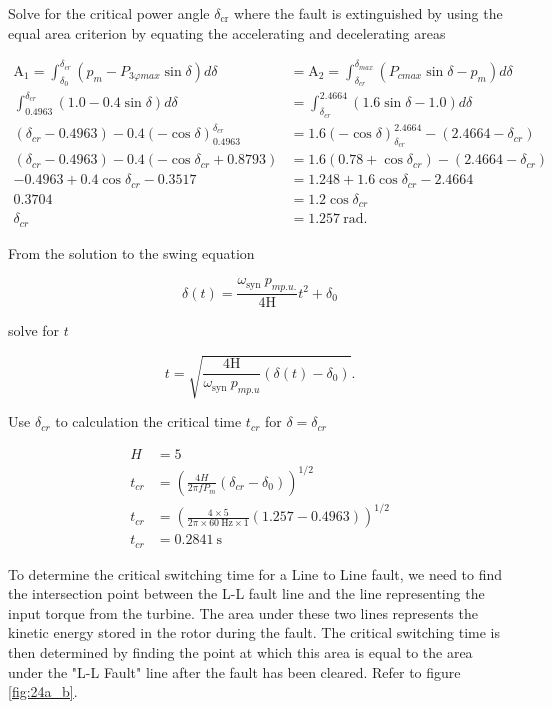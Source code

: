 \documentclass[main.tex]{subfiles}
\begin{document}
\begin{enumerate}
Solve for the critical power angle $\delta_{\mathrm{cr}}$ where the fault is extinguished by using the equal area criterion by equating the accelerating and decelerating areas 

$$
\begin{aligned}
\mathrm{A}_1=\int_{\delta_0}^{\delta_{cr}} (p_m - P_{3 \varphi max} \sin \delta) d\delta 
&= \mathrm{A}_2 = \int_{\delta_{cr}}^{\delta_{max}} (P_{cmax} \sin \delta - p_m) d \delta \\
\int_{0.4963}^{\delta_{cr}} (1.0-0.4 \sin \delta) d\delta &= \int_{\delta_{cr}}^{2.4664}(1.6 \sin \delta-1.0) d \delta \\
(\delta_{cr} - 0.4963) - 0.4(-\cos \delta)_{0.4963}^{\delta_{cr}} &= 1.6(-\cos \delta)_{\delta_{c r}}^{2.4664}-\left(2.4664-\delta_{c r}\right) \\
\left(\delta_{cr} - 0.4963\right) - 0.4\left(-\cos \delta_{cr} + 0.8793 \right) &= 1.6\left(0.78 + \cos \delta_{cr}\right) - \left(2.4664-\delta_{cr}\right) \\
-0.4963 + 0.4 \cos \delta_{cr} - 0.3517 &= 1.248 + 1.6 \cos \delta_{cr} - 2.4664 \\
0.3704 &= 1.2 \cos \delta_{c r} \\
\delta_{c r} &= 1.257 \mathrm{~rad}.
\end{aligned}
$$


From the solution to the swing equation 

$$
\delta(t)=\frac{\omega_{\text {syn }} p_{m p . u .}}{4 \mathrm{H}} t^2+\delta_0
$$

solve for $t$

$$
t=\sqrt{\frac{4 \mathrm{H}}{\omega_{\text {syn }} p_{m p . u}}\left(\delta(t)-\delta_0\right)}.
$$

Use $\delta_{cr}$ to calculation the critical time $t_{cr}$ for $\delta=\delta_{c r}$

$$
\begin{aligned}
H &= 5\\
t_{cr} &= \left(\frac{4 H}{2\pi f P_m} \left(\delta_{cr}-\delta_0\right) \right)^{1 / 2} \\
t_{cr} &= \left(\frac{4 \times 5}{2\pi \times 60 \mathrm{~Hz} \times 1} (1.257-0.4963) \right)^{1 / 2} \\
t_{cr} &= 0.2841 \mathrm{~s} 
\end{aligned}
$$

To determine the critical switching time for a Line to Line fault, we need to find the intersection point between the L-L fault line and the line representing the input torque from the turbine. The area under these two lines represents the kinetic energy stored in the rotor during the fault. The critical switching time is then determined by finding the point at which this area is equal to the area under the "L-L Fault" line after the fault has been cleared. Refer to figure \ref{fig:24a_b}.


\end{enumerate}
\end{document}
